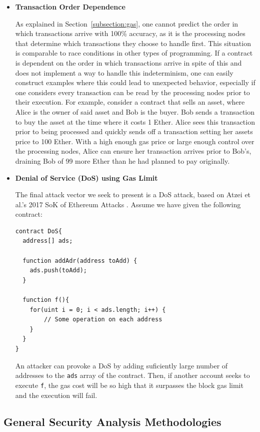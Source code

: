 \documentclass[letterpaper,twocolumn,10pt]{article}
\begin{document}
\begin{itemize}
    \item \textbf{Transaction Order Dependence}

    As explained in Section~\ref{subsection:gas}, one cannot predict the order in which transactions arrive with 100\% accuracy, as it is the processing nodes that determine which transactions they choose to handle first. This situation is comparable to race conditions in other types of programming. If a contract is dependent on the order in which transactions arrive in spite of this and does not implement a way to handle this indeterminism, one can easily construct examples where this could lead to unexpected behavior, especially if one considers every transaction can be read by the processing nodes prior to their execution. For example, consider a contract that sells an asset, where Alice is the owner of said asset and Bob is the buyer. Bob sends a transaction to buy the asset at the time where it costs 1 Ether. Alice sees this transaction prior to being processed and quickly sends off a transaction setting her assets price to 100 Ether. With a high enough gas price or large enough control over the processing nodes, Alice can ensure her transaction arrives prior to Bob's, draining Bob of 99 more Ether than he had planned to pay originally.




	\item \textbf{Denial of Service (DoS) using Gas Limit}

	The final attack vector we seek to present is a DoS attack, based on Atzei et al.'s 2017 SoK of Ethereum Attacks \cite{atzei_bartoletti_cimoli_2017}. Assume we have given the following contract:

\begin{verbatim}
contract DoS{
  address[] ads;

  function addAdr(address toAdd) {
    ads.push(toAdd);
  }

  function f(){
    for(uint i = 0; i < ads.length; i++) {
        // Some operation on each address
    }
  }
}
\end{verbatim}

An attacker can provoke a DoS by adding suficiently large number of addresses to the \verb|ads| array of the contract. Then, if another account seeks to execute \verb|f|, the gas cost will be so high that it surpasses the block gas limit and the execution will fail.

  \end{itemize}

\subsection{General Security Analysis Methodologies}
\end{document}
